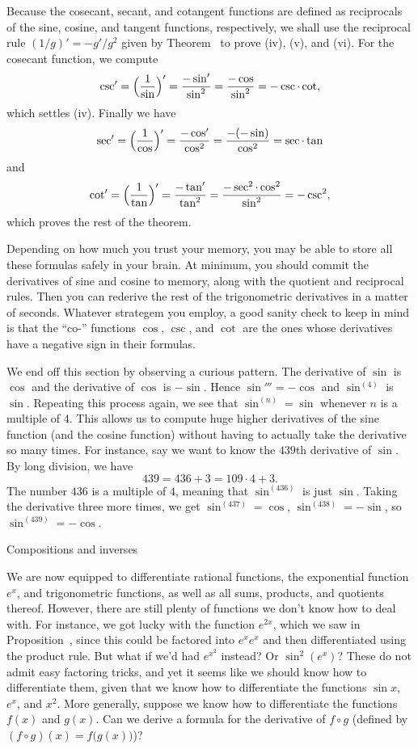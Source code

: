 Because the cosecant, secant, and cotangent functions are defined as reciprocals of
the sine, cosine, and tangent functions, respectively, we shall use the reciprocal rule
$(1/g)' = -g'/g^2$ given by Theorem~{\thmreciprocalrule}
to prove (iv), (v), and (vi). For the cosecant function, we compute
$$\csc' = \Bigl({1\over \sin}\Bigr)' = {-\sin'\over \sin^2} = {-\cos\over \sin^2} = -\csc\cdot\cot,$$
which settles (iv). Finally we have
$$\sec' = \Bigl({1\over \cos}\Bigr)' = {-\cos'\over \cos^2} = {-(-\sin)\over \cos^2} = \sec\cdot \tan$$
and
$$\cot' = \Bigl({1\over \tan}\Bigr)' = {-\tan'\over \tan^2} = {-\sec^2\cdot \cos^2\over \sin^2} = -\csc^2,$$
which proves the rest of the theorem.\slug

Depending on how much you trust your memory, you may be able to store all these formulas safely in your
brain. At minimum, you should commit the derivatives of sine and cosine to memory, along with the quotient and
reciprocal rules. Then you can rederive the rest of the trigonometric derivatives in a matter of seconds.
Whatever strategem you employ, a good sanity check to keep in mind is that the ``co-'' functions
$\cos$, $\csc$, and $\cot$ are the ones whose derivatives have a negative sign in their formulas.

We end off this section by observing a curious pattern. The derivative of $\sin$ is $\cos$
and the derivative of $\cos$ is $-\sin$. Hence $\sin''' = -\cos$ and $\sin^{(4)}$ is $\sin$.
Repeating this process again, we see that $\sin^{(n)} = \sin$ whenever $n$ is a multiple of $4$.
This allows us to compute huge higher derivatives of the sine function (and the cosine function) without
having to actually take the derivative so many times. For instance, say we want to know the $439$th derivative
of $\sin$. By long division, we have
$$439 = 436 + 3 = 109\cdot 4 + 3.$$
The number $436$ is a multiple of $4$, meaning that $\sin^{(436)}$ is just $\sin$. Taking the derivative
three more times, we get $\sin^{(437)} = \cos$, $\sin^{(438)} = -\sin$, so $\sin^{(439)} = -\cos$.

\advsect Compositions and inverses

We are now equipped to differentiate rational functions, the exponential function $e^x$,
and trigonometric functions, as well as all sums, products, and quotients thereof. However, there are still
plenty of functions we don't know how to deal with. For instance, we got lucky with the function
$e^{2x}$, which we saw in Proposition~{\propsinhderiv}, since this could be factored into $e^xe^x$ and then
differentiated using the product rule. But what if we'd had $e^{x^2}$ instead? Or $\sin^2(e^x)$?
These do not admit easy factoring tricks, and yet it seems like we should know how to differentiate them,
given that we know how to differentiate the functions $\sin x$, $e^x$, and $x^2$.
More generally, suppose we know how to differentiate the functions $f(x)$ and $g(x)$. Can we derive a formula
for the derivative of $f\circ g$ (defined by $(f\circ g)(x) = f\bigl( g(x)\bigr)$)?

